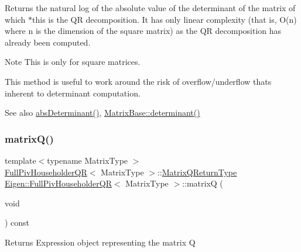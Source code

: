\begin{DoxyReturn}{Returns}
the natural log of the absolute value of the determinant of the matrix of which $\ast$this is the QR decomposition. It has only linear complexity (that is, O(n) where n is the dimension of the square matrix) as the QR decomposition has already been computed.
\end{DoxyReturn}
\begin{DoxyNote}{Note}
This is only for square matrices.

This method is useful to work around the risk of overflow/underflow that\textquotesingle{}s inherent to determinant computation.
\end{DoxyNote}
\begin{DoxySeeAlso}{See also}
\mbox{\hyperlink{class_eigen_1_1_full_piv_householder_q_r_a1029e1ccc70bb8669043c5775e7f3b75}{abs\+Determinant()}}, \mbox{\hyperlink{class_eigen_1_1_matrix_base_a7ad8f77004bb956b603bb43fd2e3c061}{Matrix\+Base\+::determinant()}} 
\end{DoxySeeAlso}
\mbox{\label{class_eigen_1_1_full_piv_householder_q_r_ad26dd2d3c002939771d2375e4e051c28}} 
\subsubsection{\texorpdfstring{matrixQ()}{matrixQ()}}
{\footnotesize\ttfamily template$<$typename Matrix\+Type $>$ \\
\mbox{\hyperlink{class_eigen_1_1_full_piv_householder_q_r}{Full\+Piv\+Householder\+QR}}$<$ Matrix\+Type $>$\+::\mbox{\hyperlink{struct_eigen_1_1internal_1_1_full_piv_householder_q_r_matrix_q_return_type}{Matrix\+Q\+Return\+Type}} \mbox{\hyperlink{class_eigen_1_1_full_piv_householder_q_r}{Eigen\+::\+Full\+Piv\+Householder\+QR}}$<$ Matrix\+Type $>$\+::matrixQ (\begin{DoxyParamCaption}\item[{void}]{ }\end{DoxyParamCaption}) const\hspace{0.3cm}{\ttfamily [inline]}}

\begin{DoxyReturn}{Returns}
Expression object representing the matrix Q 
\end{DoxyReturn}
\mbox{\label{class_eigen_1_1_full_piv_householder_q_r_a9c16411e5d8f1fc634a5797018d5aa3e}} 
